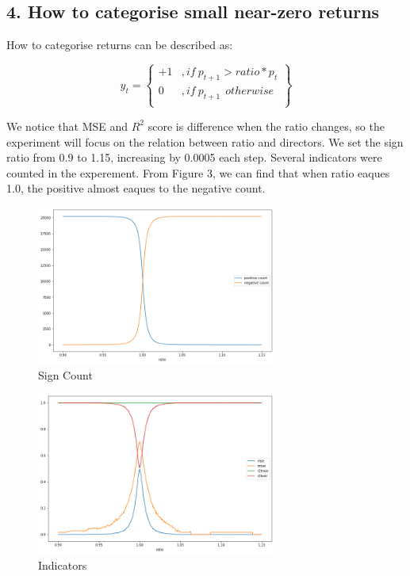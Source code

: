 \documentclass[UTF8]{ctexart}
\begin{document}
\subsection*{4. How to categorise small near-zero returns}

How to categorise returns can be described as:

\begin{equation}
	y_t= \left\{
	\begin{aligned}
		+1 & , if\ p_{t+1} > ratio * p_t \\
		0  & , if\ p_{t+1}\ \ otherwise  \\
	\end{aligned}
	\right\}
\end{equation}

We notice that MSE and $R^2$ score is difference when the ratio changes, so the experiment will focus on the relation between ratio and directors. We set the sign ratio from 0.9 to 1.15, increasing by 0.0005 each step. Several indicators were counted in the experement. From Figure 3, we can find that when ratio eaques 1.0, the positive almost eaques to the negative count.

\begin{figure}[H]
	\centerline{\includegraphics[width=0.70\textwidth]{sign_count.png}}
	\caption{Sign Count}
\end{figure}

\begin{figure}[H]
	\centerline{\includegraphics[width=0.70\textwidth]{sign_ratio.png}}
	\caption{Indicators}
\end{figure}
\end{document}
